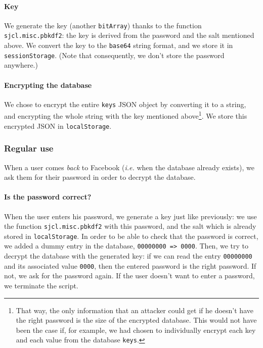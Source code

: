\documentclass[10pt,twocolumn]{article}
\begin{document}
\paragraph{Key}
We generate the key (another \texttt{bitArray}) thanks to the function \texttt{sjcl.misc.pbkdf2}: the key is derived from the password and the salt mentioned above. We convert the key to the \texttt{base64} string format, and we store it in \texttt{sessionStorage}. (Note that consequently, we don’t store the password anywhere.)

\paragraph{Encrypting the database}
We chose to encrypt the entire \texttt{keys} JSON object by converting it to a string, and encrypting the whole string with the key mentioned above\footnote{That way, the only information that an attacker could get if he doesn’t have the right password is the size of the encrypted database. This would not have been the case if, for example, we had chosen to individually encrypt each key and each value from the database \texttt{keys}.}. We store this encrypted JSON in \texttt{localStorage}.
\subsubsection{Regular use}

When a user comes \textit{back} to Facebook (\emph{i.e.} when the database already exists), we ask them for their password in order to decrypt the database. 

\paragraph{Is the password correct?}

When the user enters his password, we generate a key just like previously: we use the function \texttt{sjcl.misc.pbkdf2} with this password, and the salt which is already stored in \texttt{localStorage}. In order to be able to check that the password
is correct, we added a dummy entry in the database, \texttt{00000000 => 0000}.
Then, we try to decrypt the database with the generated key: if we can read the entry \texttt{00000000} and its associated value \texttt{0000}, then the entered password is the right password. If not, we ask for the password again. If the user doesn't want to enter a password, we terminate the script.
\end{document}
